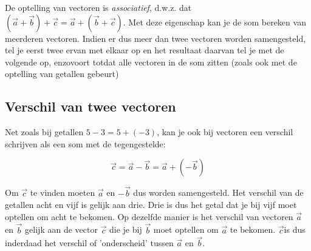 \documentclass{ximera}
\begin{document}
De optelling van vectoren is \textit{associatief}, d.w.z. dat \((\vec{a} + \vec{b}) + \vec{c} = \vec{a} + (\vec{b} + \vec{c})\). 
Met deze eigenschap kan je de som bereken van meerderen vectoren. 
Indien er dus meer dan twee vectoren worden samengesteld, tel je eerst twee ervan met elkaar op en het resultaat daarvan tel je met de volgende op, enzovoort totdat alle vectoren in de som zitten (zoals ook met de optelling van getallen gebeurt)

\subsection*{Verschil van twee vectoren}

Net zoals bij getallen $5 - 3 = 5 + (-3)$, kan je ook bij vectoren een verschil schrijven als een som met de tegengestelde: 

\[
\vec{c} = \vec{a}-\vec{b} = \vec{a} + (-\vec{b})
\]

Om \(\vec{c}\) te vinden moeten \(\vec{a}\) en \(-\vec{b}\) dus worden samengesteld.
Het verschil van de getallen acht en vijf is gelijk aan drie. 
Drie is dus het getal dat je bij vijf moet optellen om acht te bekomen. 
Op dezelfde manier is het verschil van vectoren \(\vec{a}\) en \(\vec{b}\) gelijk aan de vector \(\vec{c}\) die je bij \(\vec{b}\) moet optellen om \(\vec{a}\) te bekomen.
 \(\vec{c}\)is dus inderdaad het verschil of 'onderscheid' tussen \(\vec{a}\) en \(\vec{b}\). 


\begin{image}[!]
\end{image}
\end{document}
